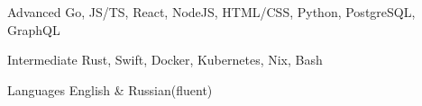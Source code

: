 
\begin{cvskills}

  \cvskill
    {Advanced}
    {Go, JS/TS, React, NodeJS, HTML/CSS, Python, PostgreSQL, GraphQL}

    \cvskill
    {Intermediate}
    {Rust, Swift, Docker, Kubernetes, Nix, Bash}

  \cvskill
    {Languages}
    {English \& Russian(fluent)}

\end{cvskills}
